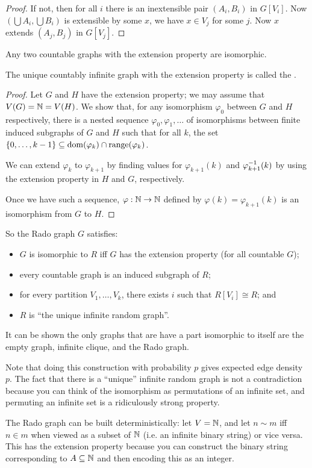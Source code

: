 \documentclass[main.tex]{subfiles}
\begin{document}
\begin{proof}
  If not, then for all $i$ there is an inextensible pair $(A_i,B_i)$ in $G[V_i]$.
  Now $\left(\bigcup A_i, \bigcup B_i\right)$ is extensible by some $x$,
  we have $x\in V_j$ for some $j$.
  Now $x$ extends $(A_j,B_j)$ in $G[V_j]$.
\end{proof}
\begin{proposition}
  Any two countable graphs with the extension property are isomorphic.
\end{proposition}
The unique countably infinite graph with the extension property is called the
.
\begin{proof}
  Let $G$ and $H$ have the extension property; we may assume that $V(G) = \mathbb N = V(H)$.
  We show that, for any isomorphism $\varphi_0$ between $G$ and $H$ respectively,
  there is a nested sequence $\varphi_0, \varphi_1, \ldots$ of isomorphisms
  between finite induced subgraphs of $G$ and $H$ such that for all $k$, the set
  $\{0,\ldots,k-1\}\subseteq\operatorname{dom}(\varphi_k)\cap\operatorname{range}(\varphi_k)$.

  We can extend $\varphi_k$ to $\varphi_{k+1}$ by finding values for
  $\varphi_{k+1}(k)$ and $\varphi_{k+1}^{-1}(k)$ by using the extension property
  in $H$ and $G$, respectively.

  Once we have such a sequence, $\varphi:\mathbb N\to\mathbb N$ defined by $\varphi(k) = \varphi_{k+1}(k)$
  is an isomorphism from $G$ to $H$.
\end{proof}
\begin{summary*}
  So the Rado graph $G$ satisfies:
  \begin{itemize}
    \item $G$ is isomorphic to $R$ iff $G$ has the extension property (for all
      countable $G$);
    \item every countable graph is an induced subgraph of $R$;
    \item for every partition $V_1,\ldots,V_k$, there exists $i$ such that
      $R[V_i]\cong R$; and
    \item $R$ is ``the unique infinite random graph''.
  \end{itemize}
\end{summary*}
It can be shown the only graphs that are have a part isomorphic to itself
are the empty graph, infinite clique, and the Rado graph.
\begin{remark*}
  Note that doing this construction with probability $p$ gives expected edge
  density $p$.
  The fact that there is a ``unique'' infinite random graph is not a
  contradiction because you can think of the isomorphism as permutations of
  an infinite set, and permuting an infinite set is a ridiculously strong
  property.
\end{remark*}
The Rado graph can be built deterministically: let $V = \mathbb N$, and let
$n\sim m$ iff $n\in m$ when viewed as a subset of $\mathbb N$ (i.e. an infinite
binary string) or vice versa.
This has the extension property because you can construct the binary string
corresponding to $A\subseteq\mathbb N$ and then encoding this as an integer.
\end{document}

